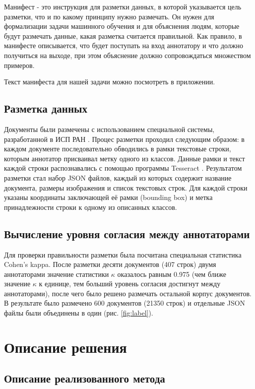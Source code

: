 \documentclass{ProcISPRAS}
\begin{document}
Манифест - это инструкция для разметки данных, в которой указывается цель разметки, что и по какому принципу нужно размечать. Он нужен для формализации задачи машинного обучения и для объяснения людям, которые будут размечать данные, какая разметка считается правильной. Как правило, в манифесте описывается, что будет поступать на вход аннотатору и что должно получиться на выходе, при этом объяснение должно сопровождаться множеством примеров.

Текст манифеста для нашей задачи можно посмотреть в приложении.

\subsection{Разметка данных}

Документы были размечены с использованием специальной системы, разработанной в ИСП РАН \cite{labeler}. Процес разметки проходил следующим образом: в каждом документе последовательно обводились в рамки текстовые строки, которым аннотатор присваивал метку одного из классов. Данные рамки и текст каждой строки распознавались с помощью программы Tesseract \cite{tesseract}.  Результатом разметки стал набор JSON файлов, каждый из которых содержит название документа, размеры изображения и список текстовых строк. Для каждой строки указаны координаты заключающей её рамки (bounding box) и метка принадлежности строки к одному из описанных классов.

\subsection{Вычисление уровня согласия между аннотаторами}

Для проверки правильности разметки была посчитана специальная статистика Cohen's kappa. После разметки десяти документов (407 строк) двумя аннотаторами значение статистики $\kappa$ оказалось равным 0.975 (чем ближе значение $\kappa$ к единице, тем больший уровень согласия достигнут между аннотаторами), после чего было решено размечать остальной корпус документов. В результате было размечено 600 документов (21350 строк) и отдельные JSON файлы были объединены в один (рис. \ref{fig:label}).

\section{Описание решения}

\subsection{Описание реализованного метода}
\end{document}
